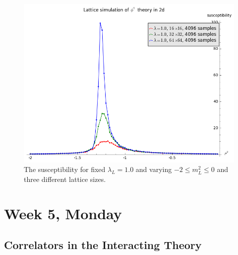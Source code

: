 \documentclass[12pt]{article}
\begin{document}
\begin{figure}[htbp]
  \centering
  \includegraphics[width=\textwidth]{figures/susceptibility-latticesize.png}
  \caption{The susceptibility for fixed $\lambda_L=1.0$ and varying
    $-2\leq m_L^2 \leq 0$ and three different lattice sizes.}
\end{figure}



\section{Week 5, Monday}


\subsection{Correlators in the Interacting Theory}
\end{document}
